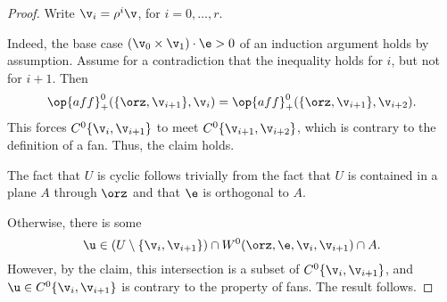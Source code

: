 \begin{proof} 
Write $\v_i = \rho^i \v$, for $i=0,\ldots,r$.

Indeed, the base case $(\v_0\times \v_1)\cdot \e > 0$ of an induction
argument holds by assumption.  Assume for a contradiction that the
inequality holds for $i$, but not for $i+1$.  Then
\begin{displaymath}
  \op{aff}^0_+(\{\orz,\v_{i+1}\},\v_i) 
= \op{aff}^0_+(\{\orz,\v_{i+1}\},\v_{i+2}).
\end{displaymath} 
This forces $C^0\{\v_i,\v_{i+1}\}$ to meet $C^0\{\v_{i+1},\v_{i+2}\}$,
which is contrary to the definition of a fan.  Thus, the claim holds.

The fact that $U$ is cyclic follows trivially from the fact that $U$
is contained in a plane $A$ through $\orz$ and that $\e$ is orthogonal
to $A$.

Otherwise, there is some 
\begin{displaymath}
  \u \in (U\setminus \{\v_i,\v_{i+1}\}) 
\cap W^0(\orz,\e,\v_i,\v_{i+1}) \cap A.
\end{displaymath}
However, by the claim, this intersection is a subset of $C^0\{\v_i,\v_{i+1}\}$, and
$\u\in C^0\{\v_i,\v_{i+1}\}$ is contrary to the property
 of fans.  The result follows.
\end{proof}

